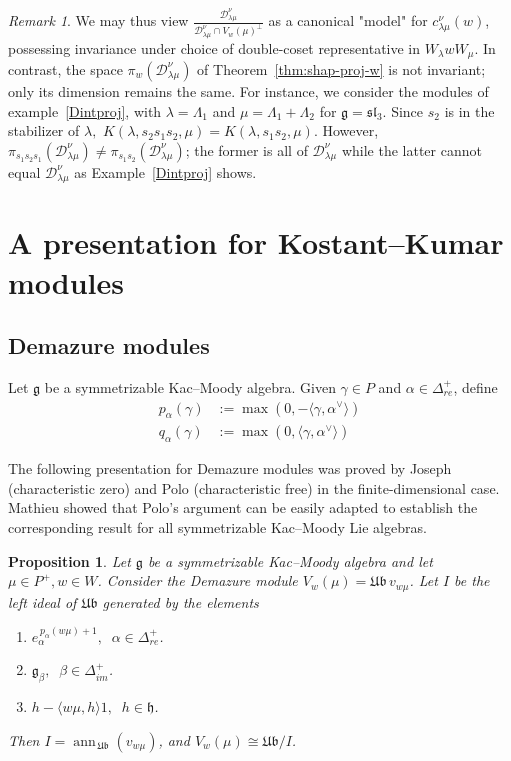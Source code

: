 \documentclass[12pt,reqno]{amsart}
\theoremstyle{plain}
\newtheorem{proposition}[theorem]{Proposition}
\theoremstyle{definition}
\theoremstyle{remark}
\newtheorem{rem}[theorem]{Remark}
\theoremstyle{plain}
\newcommand{\mcd}{\mathcal{D}_{\!\lambda\mu}^{\nu}}
\newcommand{\posreal}[1][+]{\Delta_{re}^{#1}}
\newcommand{\posimag}{\Delta_{im}^+}
\newcommand{\lie}{\mathfrak}
\newcommand{\lrw}{c_{\lambda\mu}^\nu(w)}
\DeclareMathOperator{\ann}{ann}
\begin{document}
\begin{rem}
We may thus view $\frac{\mcd}{\mcd \cap V_w(\mu)^\perp}$ as a canonical "model" for $\lrw$, possessing invariance under choice of double-coset representative in $W_\lambda w W_\mu$. In contrast, the space $\pi_w(\mcd)$ of Theorem~\ref{thm:shap-proj-w} is not invariant; only its dimension remains the same. For instance, we consider the modules of example~\ref{Dintproj}, with $\lambda = \Lambda_1$ and $\mu = \Lambda_1 + \Lambda_2$ for $\lie g = \lie{sl}_3$. Since $s_2$ is in the stabilizer of $\lambda,$ $K(\lambda,s_2s_1s_2,\mu)=K(\lambda,s_1s_2,\mu).$ However, $\pi_{s_1s_2s_1}(\mcd)\neq \pi_{s_1s_2}(\mcd)$; the former is all of $\mcd$ while the latter cannot equal $\mcd$ as Example~\ref{Dintproj} shows.  
\end{rem}

\section{A presentation for Kostant--Kumar modules}\label{sec:genrelkk}
\subsection{Demazure modules}
Let  $\mathfrak{g}$ be a symmetrizable Kac--Moody algebra. Given $\gamma \in P$ and $\alpha \in \posreal$, define 
\begin{align}
    p_\alpha(\gamma) &:= \max (0, -\langle \gamma, \alpha^\vee\rangle) \label{eq:palpha}\\
    q_\alpha(\gamma) &:= \max (0, \langle \gamma, \alpha^\vee\rangle) \label{eq:qalpha}
\end{align}

The following presentation for Demazure modules was proved by Joseph \cite{J1} (characteristic zero) and Polo \cite{P1} (characteristic free) in the finite-dimensional case. Mathieu \cite[Lemma 26]{M1} showed that Polo's argument can be easily adapted to establish the corresponding result for all symmetrizable Kac--Moody Lie algebras. 

\begin{proposition}\label{prop:dempres}
    Let $\mathfrak{g}$ be a symmetrizable Kac--Moody algebra and let $\mu\in P^+, w\in W$.  Consider the Demazure module $V_w(\mu)=\mathfrak{Ub} \,v_{w\mu}$. 
    Let $I$ be the left ideal of $\mathfrak{Ub}$ generated by the elements \begin{enumerate}
        \item $e_\alpha^{\,p_\alpha (w\mu)+1}, \;\; \alpha \in \posreal$.
        \smallskip\item ${\lie g}_\beta, \;\; \beta \in \posimag$.
        \smallskip\item $ h - \langle w\mu, h \rangle 1, \;\; h \in \mathfrak{h}$.
    \end{enumerate}
    Then $I=\ann_{\,\mathfrak{Ub}}(v_{w\mu})$, and $V_w(\mu) \cong \mathfrak{Ub}/I$.
\end{proposition}
\end{document}
